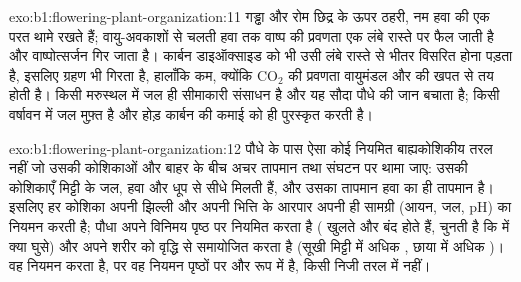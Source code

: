 \begin{solution}{exo:b1:flowering-plant-organization:11}
गड्ढा और रोम छिद्र के ऊपर ठहरी, नम हवा की एक परत थामे रखते हैं; वायु-अवकाशों
से चलती हवा तक वाष्प की प्रवणता एक लंबे रास्ते पर फैल जाती है और
वाष्पोत्सर्जन गिर जाता है। कार्बन डाइऑक्साइड को भी उसी लंबे रास्ते से
भीतर विसरित होना पड़ता है, इसलिए ग्रहण भी गिरता है, हालाँकि कम, क्योंकि
$\mathrm{CO_2}$ की प्रवणता वायुमंडल और  की खपत से तय होती है। किसी
मरुस्थल में जल ही सीमाकारी संसाधन है और यह सौदा पौधे की जान बचाता है;
किसी वर्षावन में जल मुफ़्त है और होड़ कार्बन की कमाई को ही पुरस्कृत करती है।
\end{solution}

\begin{solution}{exo:b1:flowering-plant-organization:12}
पौधे के पास ऐसा कोई नियमित बाह्यकोशिकीय तरल नहीं जो उसकी कोशिकाओं और बाहर
के बीच अचर तापमान तथा संघटन पर थामा जाए: उसकी कोशिकाएँ मिट्टी के जल,
हवा और धूप से सीधे मिलती हैं, और उसका तापमान हवा का ही तापमान है। इसलिए
हर कोशिका अपनी झिल्ली और अपनी भित्ति के आरपार अपनी ही सामग्री (आयन,
जल, pH) का नियमन करती है; पौधा अपने विनिमय पृष्ठ पर नियमित करता है (
खुलते और बंद होते हैं,  चुनती है कि  में क्या घुसे) और
अपने शरीर को वृद्धि से समायोजित करता है (सूखी मिट्टी में अधिक , छाया
में अधिक )। वह नियमन करता है, पर वह नियमन पृष्ठों पर और रूप में
है, किसी निजी तरल में नहीं।
\end{solution}

